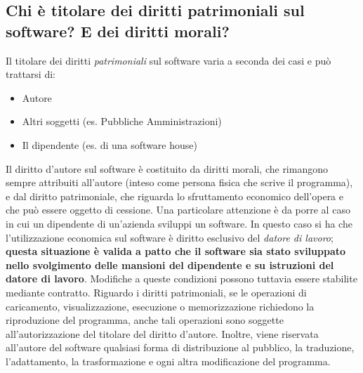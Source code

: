 \subsection{Chi è titolare dei diritti patrimoniali sul software? E dei diritti morali?}
Il titolare dei diritti \emph{patrimoniali} sul software varia a seconda dei casi e può trattarsi di:
\begin{itemize}
    \item Autore
    \item Altri soggetti (es. Pubbliche Amministrazioni)
    \item Il dipendente (es. di una software house)
\end{itemize}
Il diritto d'autore sul software è costituito da diritti morali, che rimangono sempre attribuiti all'autore
(inteso come persona fisica che scrive il programma), e dal diritto patrimoniale, che riguarda lo sfruttamento economico dell'opera
e che può essere oggetto di cessione.\newline
Una particolare attenzione è da porre al caso in cui un dipendente di un'azienda sviluppi un software. In questo caso si ha
che l'utilizzazione economica sul software è diritto esclusivo del \emph{datore di lavoro}; \textbf{questa situazione è valida a patto che
il software sia stato sviluppato nello svolgimento delle mansioni del dipendente e su istruzioni del datore di lavoro}. Modifiche a
queste condizioni possono tuttavia essere stabilite mediante contratto. \newline
Riguardo i diritti patrimoniali, se le operazioni di caricamento, visualizzazione, esecuzione o
memorizzazione richiedono la riproduzione del programma, anche tali operazioni sono soggette all'autorizzazione del titolare del diritto d'autore.
Inoltre, viene riservata all'autore del software qualsiasi forma di distribuzione al pubblico, la traduzione, l'adattamento, la trasformazione e ogni
altra modificazione del programma.

